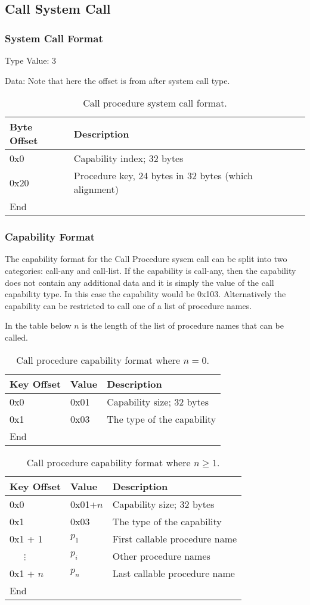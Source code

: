 \documentclass[english,a4paper]{article}
\let\oldparagraph\subsubsection
\renewcommand{\subsubsection}[1]{\oldparagraph{#1}\mbox{}}
\begin{document}
\subsection{Call System Call}

\subsubsection{System Call Format}
Type Value: 3

Data: Note that here the offset is from after system call type.

\begin{table}[H]
  \caption{Call procedure system call format.}
  \centering{}%
  \begin{tabular}{l|p{}}
    \hline
    Byte Offset & Description\tabularnewline
    \hline
    \hline
    0x0 & Capability index; 32 bytes \tabularnewline
    0x20 & Procedure key, 24 bytes in 32 bytes (which alignment) \tabularnewline
    \hline
    End &  \tabularnewline
    \hline
  \end{tabular}
\end{table}

\subsubsection{Capability Format}
The capability format for the Call Procedure sysem call can be split into two
categories: call-any and call-list. If the capability is call-any, then the
capability does not contain any additional data and it is simply the value of
the call capability type. In this case the capability would be 0x103.
Alternatively the capability can be restricted to call one of a list of
procedure names.

In the table below $n$ is the length of the list of procedure names that can be
called.

\begin{table}[H]
  \caption{Call procedure capability format where $n = 0$.}
  \centering{}%
  \begin{tabular}{l|l|p{}}
    \hline
    Key Offset & Value & Description\tabularnewline
    \hline
    \hline
    0x0 & 0x01 & Capability size; 32 bytes \tabularnewline
    0x1 & 0x03 & The type of the capability \tabularnewline
    \hline
    End &  \tabularnewline
    \hline
  \end{tabular}
\end{table}

\begin{table}[H]
  \caption{Call procedure capability format where $n \geq 1$.}
  \centering{}%
  \begin{tabular}{l|l|p{}}
    \hline
    Key Offset & Value & Description\tabularnewline
    \hline
    \hline
    0x0 & 0x01+$n$ & Capability size; 32 bytes \tabularnewline
    0x1 & 0x03 & The type of the capability \tabularnewline
    0x1 + 1 & $p_1$ & First callable procedure name \tabularnewline
    ~~~$\vdots$ & $p_i$ & Other procedure names \tabularnewline
    0x1 + $n$ & $p_n$ & Last callable procedure name \tabularnewline
    \hline
    End &  \tabularnewline
    \hline
  \end{tabular}
\end{table}
\end{document}
